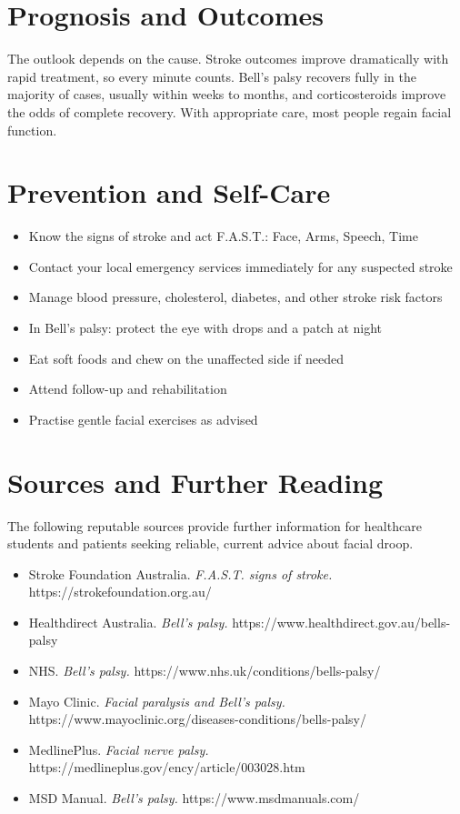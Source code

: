 \section*{Prognosis and Outcomes}
The outlook depends on the cause. Stroke outcomes improve dramatically with rapid treatment, so every minute counts. Bell's palsy recovers fully in the majority of cases, usually within weeks to months, and corticosteroids improve the odds of complete recovery. With appropriate care, most people regain facial function.

\section*{Prevention and Self-Care}
\begin{itemize}
    \item Know the signs of stroke and act F.A.S.T.: Face, Arms, Speech, Time
    \item Contact your local emergency services immediately for any suspected stroke
    \item Manage blood pressure, cholesterol, diabetes, and other stroke risk factors
    \item In Bell's palsy: protect the eye with drops and a patch at night
    \item Eat soft foods and chew on the unaffected side if needed
    \item Attend follow-up and rehabilitation
    \item Practise gentle facial exercises as advised
\end{itemize}

\section*{Sources and Further Reading}
The following reputable sources provide further information for healthcare students and patients seeking reliable, current advice about facial droop.
\begin{itemize}
    \item Stroke Foundation Australia. \textit{F.A.S.T. signs of stroke.} https://strokefoundation.org.au/
    \item Healthdirect Australia. \textit{Bell's palsy.} https://www.healthdirect.gov.au/bells-palsy
    \item NHS. \textit{Bell's palsy.} https://www.nhs.uk/conditions/bells-palsy/
    \item Mayo Clinic. \textit{Facial paralysis and Bell's palsy.} https://www.mayoclinic.org/diseases-conditions/bells-palsy/
    \item MedlinePlus. \textit{Facial nerve palsy.} https://medlineplus.gov/ency/article/003028.htm
    \item MSD Manual. \textit{Bell's palsy.} https://www.msdmanuals.com/
\end{itemize}
